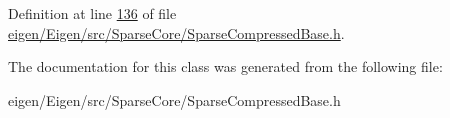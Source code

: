 Definition at line \hyperlink{eigen_2_eigen_2src_2_sparse_core_2_sparse_compressed_base_8h_source_l00136}{136} of file \hyperlink{eigen_2_eigen_2src_2_sparse_core_2_sparse_compressed_base_8h_source}{eigen/\+Eigen/src/\+Sparse\+Core/\+Sparse\+Compressed\+Base.\+h}.



The documentation for this class was generated from the following file\+:\begin{DoxyCompactItemize}
\item 
eigen/\+Eigen/src/\+Sparse\+Core/\+Sparse\+Compressed\+Base.\+h\end{DoxyCompactItemize}

